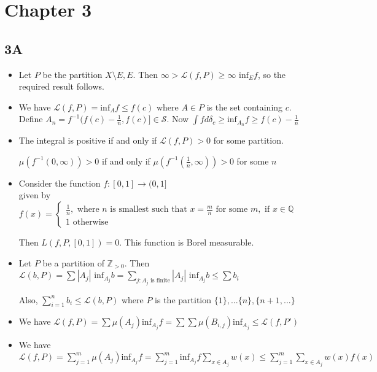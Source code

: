 \documentclass{article}
\begin{document}
\section*{Chapter 3}
\subsection*{3A}
\begin{itemize}
    \item [1] Let $P$ be the partition $X\setminus E,E$. Then $\infty>\mathcal{L}(f,P)\geq \infty \text{ inf}_Ef$, so the required result follows.
    \item[2] We have $\mathcal{L}(f,P)=\text{inf}_Af \leq f(c)$ where $A \in P$ is the set containing $c$. Define $A_n=f^{-1}(f(c)-\frac{1}{n},f(c)] \in \mathcal{S}$. Now $\int fd\delta_c\geq \text{inf}_{A_n}f\geq f(c)-\frac{1}{n}$

    \item[3] The integral is positive if and only if $\mathcal{L}(f,P)>0$ for some partition.

    $\mu(f^{-1}(0,\infty))>0$ if and only if $\mu(f^{-1}(\frac{1}{n},\infty))>0$ for some $n$

    \item[4] Consider the function $f:[0,1]\to(0,1]$ \\ given by $f(x)=\begin{cases}
        \frac{1}{n}, \text{ where }n \text{ is smallest such that } x=\frac{m}{n} \text{ for some }m, \text{ if } x \in \mathbb{Q} \\
        1 \text{ otherwise}
    \end{cases}$ 

    Then $L(f,P,[0,1])=0$. This function is Borel measurable.

    \item[5] Let $P$ be a partition of $\mathbb{Z}_{>0}$. Then $\mathcal{L}(b,P)=\sum|A_j|\text{ inf}_{A_j}b= \sum_{j:A_j \text{ is finite}}|A_j|\text{ inf}_{A_j}b\leq \sum b_i$

    Also, $\sum_{i=1}^nb_i\leq\mathcal{L}(b,P)$ where $P$ is the partition $\{1\},...\{n\},\{n+1,...\}$

    \item[6] We have $\mathcal{L}(f,P)=\sum\mu(A_j)\text{inf}_{A_j}f=\sum\sum\mu(B_{i,j})\text{inf}_{A_j}\leq\mathcal{L}(f,P')$

    \item[7] We have $\mathcal{L}(f,P)=\sum_{j=1}^m\mu(A_j) \text{inf}_{A_j}f=\sum_{j=1}^m \text{inf}_{A_j}f \sum_{x \in A_j}w(x)\leq \sum_{j=1}^m \sum_{x \in A_j} w(x)f(x)$


\end{itemize}
\end{document}
